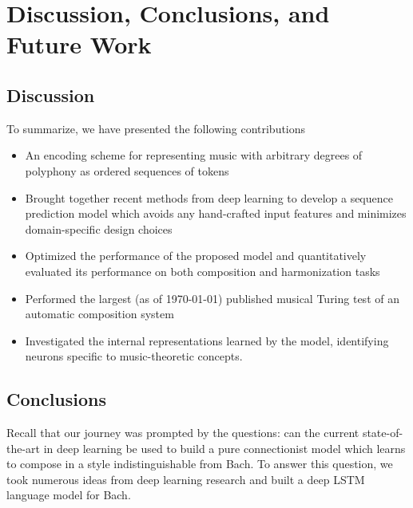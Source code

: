 \chapter{Discussion, Conclusions, and Future Work}\label{ch:conclusion}


\ifpdf
    \graphicspath{{Chapter8/Figs/Raster/}{Chapter8/Figs/PDF/}{Chapter8/Figs/}}
\else
    \graphicspath{{Chapter8/Figs/Vector/}{Chapter8/Figs/}}
\fi

\section{Discussion}

To summarize, we have presented the following contributions
\begin{itemize}
    \item An encoding scheme for representing music with arbitrary degrees of polyphony
        as ordered sequences of tokens
    \item Brought together recent methods from deep learning to develop a
        sequence prediction model which avoids any hand-crafted input features
        and minimizes domain-specific design choices
    \item Optimized the performance of the proposed model and quantitatively
        evaluated its performance on both composition and harmonization tasks
    \item Performed the largest (as of \today) published musical Turing test of an
        automatic composition system
    \item Investigated the internal representations learned by the model, identifying
        neurons specific to music-theoretic concepts.
\end{itemize}

\section{Conclusions}

Recall that our journey was prompted by the questions: can the current
state-of-the-art in deep learning be used to build a pure connectionist
model which learns to compose in a style indistinguishable from Bach. To
answer this question, we took numerous ideas from deep learning research
and built a deep LSTM language model for Bach.

